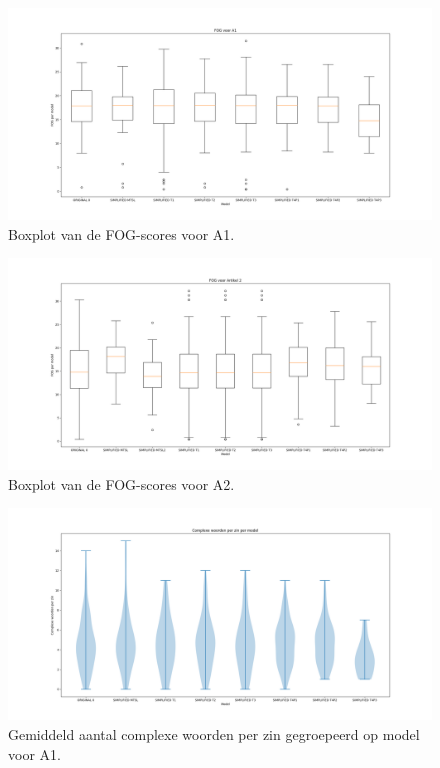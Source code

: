 \begin{figure}
	\includegraphics[width=\linewidth]{img/boxplot-fog-a1.png}
	\caption{Boxplot van de FOG-scores voor A1.}
	\label{img:boxplot-fog-a1}
\end{figure}

\begin{figure}
	\includegraphics[width=\linewidth]{img/boxplot-fog-a2.png}
	\caption{Boxplot van de FOG-scores voor A2.}
	\label{img:boxplot-fog-a2}
\end{figure}

\begin{figure}
	\includegraphics[width=\linewidth]{img/violinplot-complex-a1.png}
	\caption{Gemiddeld aantal complexe woorden per zin gegroepeerd op model voor A1.}
	\label{img:violinplot-complex-a1}
\end{figure}

